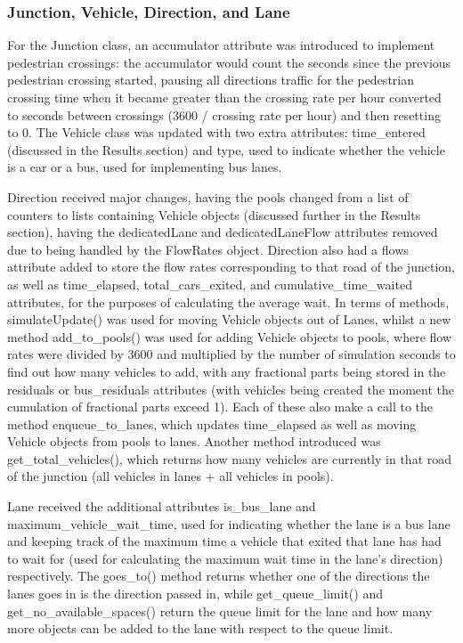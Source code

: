 \documentclass{article}
\begin{document}
    \subsubsection{Junction, Vehicle, Direction, and Lane}
    For the Junction class, an accumulator attribute was introduced to implement pedestrian crossings: the accumulator would
    count the seconds since the previous pedestrian crossing started, pausing all directions traffic for the pedestrian crossing
    time when it became greater than the crossing rate per hour converted to seconds between crossings (3600 / crossing rate per hour)
    and then resetting to 0. The Vehicle class was updated with two extra attributes: time\_entered (discussed in the Results section) and
    type, used to indicate whether the vehicle is a car or a bus, used for implementing bus lanes.

    Direction received major changes, having the pools changed from a list of counters to lists containing Vehicle objects (discussed further
    in the Results section), having the dedicatedLane and dedicatedLaneFlow attributes removed due to being handled by the FlowRates object.
    Direction also had a flows attribute added to store the flow rates corresponding to that road of the junction, as well as time\_elapsed,
    total\_cars\_exited, and cumulative\_time\_waited attributes, for the purposes of calculating the average wait. In terms of methods,
    simulateUpdate() was used for moving Vehicle objects out of Lanes, whilst a new method add\_to\_pools() was used for adding Vehicle objects
    to pools, where flow rates were divided by 3600 and multiplied by the number of simulation seconds to find out how many vehicles to add,
    with any fractional parts being stored in the residuals or bus\_residuals attributes (with vehicles being created the moment the cumulation
    of fractional parts exceed 1). Each of these also make a call to the method enqueue\_to\_lanes, which updates time\_elapsed as well as moving
    Vehicle objects from pools to lanes. Another method introduced was get\_total\_vehicles(), which returns how many vehicles are currently in
    that road of the junction (all vehicles in lanes + all vehicles in pools).

    Lane received the additional attributes is_bus_lane and maximum_vehicle_wait_time, used for indicating whether the lane is a bus lane and 
    keeping track of the maximum time a vehicle that exited that lane has had to wait for (used for calculating the maximum wait time in the 
    lane’s direction) respectively. The goes_to() method returns whether one of the directions the lanes goes in is the direction passed in, 
    while get_queue_limit() and get_no_available_spaces() return the queue limit for the lane and how many more objects can be added to the 
    lane with respect to the queue limit.
\end{document}
